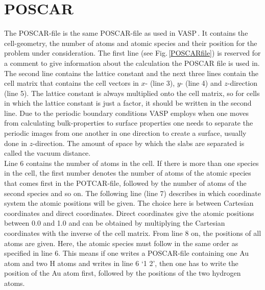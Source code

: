 \documentclass[twoside, 11pt, titlepage, captions=nooneline, a4paper, headsepline]{scrbook}%
\newcommand{\9}{\mathrm}
\newcommand{\0}{\,\mathrm}
\begin{document}
\section{POSCAR}
\label{Sec:VASP:POSCAR}
The \textsc{POSCAR}-file is the same POSCAR-file as used in VASP\,\cite{vasp1,vasp2,vasp3,vasp4,vasp_manual,vasp_online}. It contains the cell-geometry, the number of atoms and atomic species and their position for the problem under consideration. The first line (see Fig.\,\ref{POSCARfile}) is reserved for a comment to give information about the calculation the POSCAR file is used in. The second line contains the lattice constant and the next three lines contain the cell matrix that contains the cell vectors in $x$- (line 3), $y$- (line 4) and $z$-direction (line 5). The lattice constant is always multiplied onto the cell matrix, so for cells in which the lattice constant is just a factor, it should be written in the second line. Due to the periodic boundary conditions VASP employs when one moves from calculating bulk-properties to surface properties one needs to separate the periodic images from one another in one direction to create a surface, usually done in $z$-direction. The amount of space by which the slabs are separated is called the vacuum distance.\\
Line 6 contains the number of atoms in the cell. If there is more than one species in the cell, the first number denotes the number of atoms of the atomic species that comes first in the POTCAR-file, followed by the number of atoms of the second species and so on. The following line (line 7) describes in which coordinate system the atomic positions will be given. The choice here is between Cartesian coordinates and direct coordinates. Direct coordinates give the atomic positions between 0.0 and 1.0 and can be obtained by multiplying the Cartesian coordinates with the inverse of the cell matrix. From line 8 on, the positions of all atoms are given. Here, the atomic species must follow in the same order as specified in line 6. This means if one writes a POSCAR-file containing one Au atom and two H atoms and writes in line 6 `1 2', then one has to write the position of the Au atom first, followed by the positions of the two hydrogen atoms.
\end{document}
